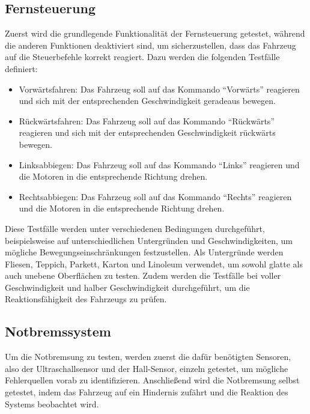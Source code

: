     \subsection{Fernsteuerung}
    Zuerst wird die grundlegende Funktionalität der Fernsteuerung getestet, während die anderen Funktionen deaktiviert sind, um sicherzustellen, dass das Fahrzeug auf die Steuerbefehle korrekt reagiert. Dazu werden die folgenden Testfälle definiert:
    \begin{itemize}
        \item Vorwärtsfahren: Das Fahrzeug soll auf das Kommando \enquote{Vorwärts} reagieren und sich mit der entsprechenden Geschwindigkeit geradeaus bewegen.
        \item Rückwärtsfahren: Das Fahrzeug soll auf das Kommando \enquote{Rückwärts} reagieren und sich mit der entsprechenden Geschwindigkeit rückwärts bewegen.
        \item Linksabbiegen: Das Fahrzeug soll auf das Kommando \enquote{Links} reagieren und die Motoren in die entsprechende Richtung drehen.
        \item Rechtsabbiegen: Das Fahrzeug soll auf das Kommando \enquote{Rechts} reagieren und die Motoren in die entsprechende Richtung drehen.
    \end{itemize}
    Diese Testfälle werden unter verschiedenen Bedingungen durchgeführt, beispielsweise auf unterschiedlichen Untergründen und Geschwindigkeiten, um mögliche Bewegungseinschränkungen festzustellen. Als Untergründe werden Fliesen, Teppich, Parkett, Karton und Linoleum verwendet, um sowohl glatte als auch unebene Oberflächen zu testen. Zudem werden die Testfälle bei voller Geschwindigkeit und halber Geschwindigkeit durchgeführt, um die Reaktionsfähigkeit des Fahrzeugs zu prüfen.

    \subsection{Notbremssystem}
    Um die Notbremsung zu testen, werden zuerst die dafür benötigten Sensoren, also der Ultraschallsensor und der Hall-Sensor, einzeln getestet, um mögliche Fehlerquellen vorab zu identifizieren. Anschließend wird die Notbremsung selbst getestet, indem das Fahrzeug auf ein Hindernis zufährt und die Reaktion des Systems beobachtet wird. 


